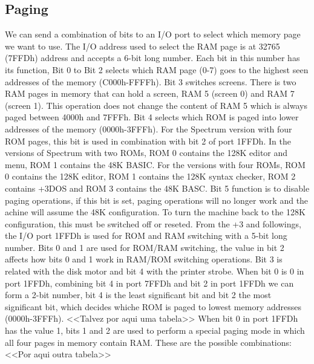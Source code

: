 \subsection{Paging}
We can send a combination of bits to an I/O port to select which memory page we want to use. The I/O address used to select the RAM page is at 32765 (7FFDh) address and accepts a 6-bit long number. Each bit in this number has its function, Bit 0 to Bit 2 selects which RAM page (0-7) goes to the highest seen addresses of the memory (C000h-FFFFh). Bit 3 switches screens. There is two RAM pages in memory that can hold a screen, RAM 5 (screen 0) and RAM 7 (screen 1). This operation does not change the content of RAM 5 which is always paged between 4000h and 7FFFh. Bit 4 selects which ROM is paged into lower addresses of the memory (0000h-3FFFh). For the Spectrum version with four ROM pages, this bit is used in combination with bit 2 of port 1FFDh. In the versions of Spectrum with two ROMs, ROM 0 contains the 128K editor and menu, ROM 1 contains the 48K BASIC. For the versions with four ROMs, ROM 0 contains the 128K editor, ROM 1 contains the 128K syntax checker, ROM 2 contains +3DOS and ROM 3 contains the 48K BASC. Bit 5 function is to disable paging operations, if this bit is set, paging operations will no longer work and the achine will assume the 48K configuration. To turn the machine back to the 128K configuration, this must be switched off or reseted.
From the +3 and followings, the I/O port 1FFDh is used for ROM and RAM switching with a 5-bit long number. Bits 0 and 1 are used for ROM/RAM switching, the value in bit 2 affects how bits 0 and 1 work in RAM/ROM switching operations. Bit 3 is related with the disk motor and bit 4 with the printer strobe.
When bit 0 is 0 in port 1FFDh, combining bit 4 in port 7FFDh and bit 2 in port 1FFDh we can form a 2-bit number, bit 4 is the least significant bit and bit 2 the most significant bit, which decides whiche ROM is paged to lowest memory addresses (0000h-3FFFh). <<Talvez por aqui uma tabela>>
When bit 0 in port 1FFDh has the value 1, bits 1 and 2 are used to perform a special paging mode in which all four pages in memory contain RAM. These are the possible combinations:
<<Por aqui outra tabela>>
